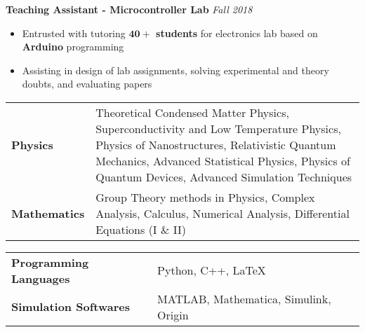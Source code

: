 \documentclass[10pt]{article}%
\newcommand{\xfilll}[2][1ex]{
\dimen0=#2\advance\dimen0 by #1
\leaders\hrule height \dimen0 depth -#1\hfill}
\begin{document}
{\begin{itemize}
\end{itemize}
{\flushleft \bf \large{Teaching Assistant - Microcontroller Lab}}  \hfill\textit{Fall 2018} \\
\begin{itemize}
\vspace{-4mm}
\setlength\itemsep{0.01em}
    \item Entrusted with tutoring \textbf{$\mathbf{40+}$ students} for electronics lab based on \textbf{Arduino} programming 
    \item Assisting in design of lab assignments, solving experimental and theory doubts, and evaluating papers
    
\end{itemize}

  
\begin{tabular}{ l p{13cm}}
    
    \textbf{Physics} & Theoretical Condensed Matter Physics, Superconductivity and Low Temperature Physics, Physics of Nanostructures, Relativistic Quantum Mechanics, Advanced Statistical Physics, Physics of Quantum Devices, Advanced Simulation Techniques \vspace{2mm}    \\ 
    \textbf{Mathematics} & Group Theory methods in Physics, Complex Analysis, Calculus, Numerical Analysis, Differential Equations (I \& II) \\ 
\end{tabular}
\vspace{-1mm}
\begin{tabular}{l l}

\textbf{Programming Languages} & Python, C++,  \LaTeX  \vspace{4pt}\\
\textbf{Simulation Softwares} & MATLAB, Mathematica, Simulink, Origin
\end{tabular} 

}
\end{document}
